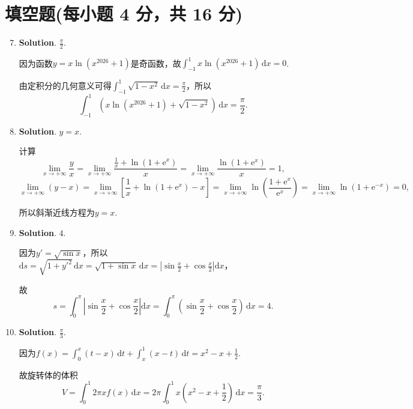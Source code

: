 \documentclass[../main.tex]{subfiles}
\begin{document}
\section{填空题(每小题 4 分，共 16 分)}
\begin{enumerate}
    \setcounter{enumi}{6}
    \item \textbf{Solution}. $\frac{\pi}{2}$.

          因为函数$y=x\ln\left(x^{2026}+1\right)$是奇函数，故$\int_{-1}^{1}x\ln\left(x^{2026}
              +1\right)\,\mathrm{d}x=0$.

          由定积分的几何意义可得$\int_{-1}^{1}\sqrt{1-x^{2}}\,\mathrm{d}x=\frac{\pi}{2}$，所以
          \[
              \int_{-1}^{1}\left(x\ln\left(x^{2026}+1\right)+\sqrt{1-x^{2}}\right)\,\mathrm{d}x
              =\frac{\pi}{2}.
          \]

    \item \textbf{Solution}. $y=x$.

          计算
          \[
              \lim_{x\to+\infty}\frac{y}{x}=\lim_{x\to+\infty}\frac{\frac{1}{x}+\ln\left(1+\mathrm{e}^{x}\right)}{x}=\lim_{x\to+\infty}\frac{\ln\left(1+\mathrm{e}^{x}\right)}{x}=1,
          \]
          \[
              \lim_{x\to+\infty}(y-x)=\lim_{x\to+\infty}\left[\frac{1}{x}+\ln\left(1+\mathrm{e}^{x}\right)-x\right]=\lim_{x\to+\infty}\ln\left(\frac{1+\mathrm{e}^{x}}{\mathrm{e}^{x}}\right)=\lim_{x\to+\infty}\ln\left(1+\mathrm{e}^{-x}\right)=0,
          \]

          所以斜渐近线方程为$y=x$.

    \item \textbf{Solution}. $4$.

          因为$y'=\sqrt{\sin x}$，所以$\mathrm{d}s=\sqrt{1+y'^{2}}\,\mathrm{d}x=\sqrt{1+\sin
                  x}\,\mathrm{d}x=\left|\sin\frac{x}{2}+\cos\frac{x}{2}\right|\mathrm{d}x$，

          故
          \[
              s=\int_{0}^{\pi}\left|\sin\frac{x}{2}+\cos\frac{x}{2}\right|\mathrm{d}x=
              \int_{0}^{\pi}\left(\sin\frac{x}{2}+\cos\frac{x}{2}\right)\,\mathrm{d}x=4.
          \]

    \item \textbf{Solution}. $\frac{\pi}{3}$.

          因为$f(x)=\int_{0}^{x}(t-x)\,\mathrm{d}t+\int_{x}^{1}(x-t)\,\mathrm{d}t=x^{2}-x+\frac{1}{2}$.

          故旋转体的体积
          \[
              V=\int_{0}^{1}2\pi xf(x)\,\mathrm{d}x=2\pi\int_{0}^{1}x\left(x^{2}
              -x+\frac{1}{2}\right)\,\mathrm{d}x=\frac{\pi}{3}.
          \]
\end{enumerate}
\end{document}
